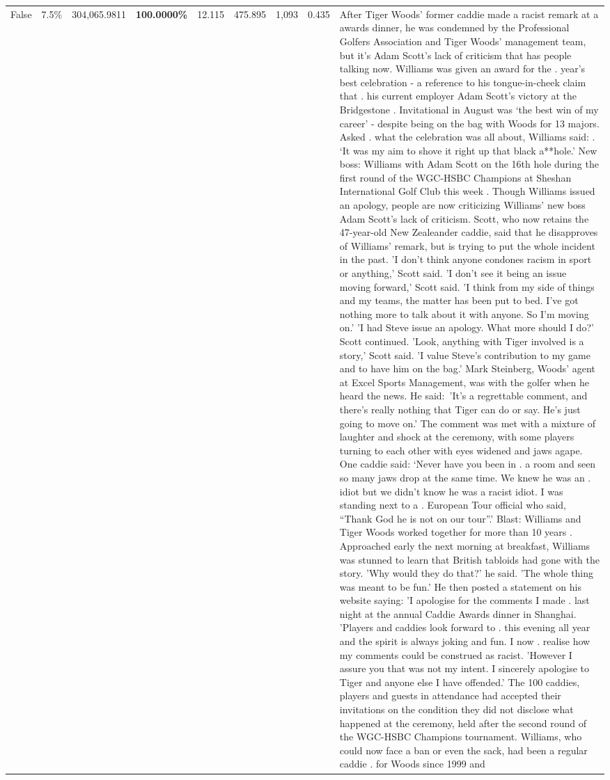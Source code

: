 \begin{table}[H]
\begin{tabular}{lllrlllll}
False & 7.5\% & 304,065.9811 & \bfseries \color{red} 100.0000\% & 12.115 & 475.895 & 1,093 & 0.435 & After Tiger Woods' former caddie made a racist remark at a awards dinner, he was condemned by the Professional Golfers Association and Tiger Woods' management team, but it's Adam Scott's lack of criticism that has people talking now. Williams was given an award for the . year’s best celebration - a reference to his tongue-in-cheek claim that . his current employer Adam Scott’s victory at the Bridgestone . Invitational in August was ‘the best win of my career’ - despite being on the bag with Woods for 13 majors. Asked . what the celebration was all about, Williams said: . ‘It was my aim to shove it right up that black a**hole.’ New boss: Williams with Adam Scott  on the 16th hole during the first round of the WGC-HSBC Champions at Sheshan International Golf Club this week . Though Williams issued an apology, people are now criticizing Williams' new boss Adam Scott's lack of criticism. Scott, who now retains the 47-year-old New Zealeander caddie, said that he disapproves of Williams' remark, but is trying to put the whole incident in the past. 'I don't think anyone condones racism in sport or anything,' Scott said. 'I don't see it being an issue moving forward,' Scott said. 'I think from my side of things and my teams, the matter has been put to bed. I've got nothing more to talk about it with anyone. So I'm moving on.' 'I had Steve issue an apology. What more should I do?' Scott continued. 'Look, anything with Tiger involved is a story,' Scott said. 'I value Steve's contribution to my game and to have him on the bag.' Mark Steinberg, Woods' agent at Excel Sports Management, was with the golfer when he heard the news. He said: 'It's a regrettable comment, and there's really nothing that Tiger can do or say. He's just going to move on.' The comment was met with a mixture of laughter and shock at the ceremony, with some players turning to each other with eyes widened and jaws agape. One caddie said: ‘Never have you been in . a room and seen so many jaws drop at the same time. We knew he was an . idiot but we didn’t know he was a racist idiot. I was standing next to a . European Tour official who said, “Thank God he is not on our tour”.’ Blast: Williams and Tiger Woods worked together for more than 10 years . Approached early the next morning at breakfast, Williams was stunned to learn that British tabloids had gone with the story. 'Why would they do that?' he said. 'The whole thing was meant to be fun.' He then posted a statement on his website saying: 'I apologise for the comments I made . last night at the annual Caddie Awards dinner in Shanghai. 'Players and caddies look forward to . this evening all year and the spirit is always joking and fun. I now . realise how my comments could be construed as racist. 'However I assure you that was not my intent. I sincerely apologise to Tiger and anyone else I have offended.' The 100 caddies, players and guests in attendance had accepted their invitations on the condition they did not disclose what happened at the ceremony, held after the second round of the WGC-HSBC Champions tournament. Williams, who could now face a ban or even the sack, had been a regular caddie . for Woods since 1999 and 
\end{tabular}
\end{table}
